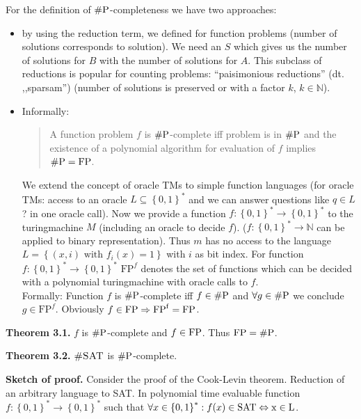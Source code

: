 \documentclass[a4paper]{article}
\newcommand{\cls}[1]{\rm{#1}}
\newcommand{\probl}[1]{\text{\textsc{#1}}}
\newcommand{\set}[1]{\left\{#1\right\}}
\begin{document}
For the definition of $\cls{\#P}$-completeness we have two approaches:
\begin{itemize}
  \item by using the reduction term, we defined for function problems
        (number of solutions corresponds to solution).
        We need an $S$ which gives us the number of solutions for $B$
        with the number of solutions for $A$. This subclass of reductions
        is popular for counting problems: ``paisimonious reductions''
        (dt. ,,sparsam'') (number of solutions is preserved or with a
        factor $k$, $k \in \mathbb{N}$).
  \item Informally:
        \begin{quotation}
          A function problem $f$ is $\cls{\#P}$-complete iff problem is in $\cls{\#P}$
          and the existence of a polynomial algorithm for evaluation
          of $f$ implies $\cls{\#P} = \cls{FP}$.
        \end{quotation}
        We extend the concept of oracle TMs to simple function languages
        (for oracle TMs: access to an oracle $L \subseteq \set{0,1}^*$ and
        we can answer questions like $q \in L$? in one oracle call).
        Now we provide a function $f : \set{0,1}^* \rightarrow \set{0,1}^*$
        to the turingmachine $M$ (including an oracle to decide $f$).
        ($f: \set{0,1}^* \rightarrow \mathbb{N}$ can be applied to binary
        representation). Thus $m$ has no access to the language $L =
        \set{(x,i) \text{ with } f_i(x) = 1}$ with $i$ as bit index.
        For function $f: \set{0,1}^* \rightarrow \set{0,1}^*$ $\text{FP}^f$
        denotes the set of functions which can be decided with a polynomial
        turingmachine with oracle calls to $f$. \\
        Formally: Function $f$ is $\cls{\#P}$-complete iff $f \in \cls{\#P}$ and
        $\forall g \in \cls{\#P}$ we conclude $g \in \text{FP}^f$.
        Obviously $f \in \cls{FP} \Rightarrow \text{FP}^f = \cls{FP}$.
\end{itemize}

\textbf{Theorem 3.1.}
  $f$ is $\cls{\#P}$-complete and $f \in \cls{FP}$. Thus $\cls{FP} = \cls{\#P}$.

\textbf{Theorem 3.2.}
  $\probl{\#SAT}$ is $\cls{\#P}$-complete.

\textbf{Sketch of proof.}
  Consider the proof of the Cook-Levin theorem.
  Reduction of an arbitrary language to SAT.
  In polynomial time evaluable function $f: \set{0,1}^* \rightarrow \set{0,1}^*$
  such that $\forall x \in \set{0,1}^*: f(x) \in \cls{SAT} \Leftrightarrow x \in L$.
\end{document}

